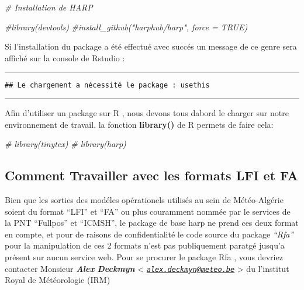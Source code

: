 \documentclass[
]{article}
\newenvironment{Shaded}{\begin{snugshade}}{\end{snugshade}}
\newcommand{\CommentTok}[1]{\textcolor[rgb]{0.56,0.35,0.01}{\textit{#1}}}
\begin{document}
\begin{Shaded}
\begin{Highlighting}[]
\CommentTok{\# Installation de HARP }

\CommentTok{\#library(devtools)}
\CommentTok{\#install\_github("harphub/harp", force = TRUE)}
\end{Highlighting}
\end{Shaded}

Si l'installation du package a été effectué avec succés un message de ce
genre sera affiché sur la console de Rstudio :

\begin{center}\rule{0.5\linewidth}{0.5pt}\end{center}

\begin{verbatim}
## Le chargement a nécessité le package : usethis
\end{verbatim}

\begin{center}\rule{0.5\linewidth}{0.5pt}\end{center}

Afin d'utiliser un package sur R , nous devons tous dabord le charger
sur notre environnement de travail. la fonction \textbf{library()} de R
permets de faire cela:

\begin{Shaded}
\begin{Highlighting}[]
\CommentTok{\# library(tinytex)}
\CommentTok{\# library(harp)}
\end{Highlighting}
\end{Shaded}

\hypertarget{comment-travailler-avec-les-formats-lfi-et-fa}{%
\subsection{Comment Travailler avec les formats LFI et
FA}\label{comment-travailler-avec-les-formats-lfi-et-fa}}

Bien que les sorties des modéles opérationels utilisés au sein de
Météo-Algérie soient du format ``LFI'' et ``FA'' ou plus couramment
nommée par le services de la PNT ``Fullpos'' et ``ICMSH'', le package de
base harp ne prend ces deux format en compte, et pour de raisons de
confidentialité le code source du package \emph{``Rfa''} pour la
manipulation de ces 2 formats n'est pas publiquement paratgé jusqu'a
présent sur aucun service web. Pour se procurer le package Rfa , vous
devriez contacter Monsieur \textbf{\emph{Alex} \emph{Deckmyn}}
\textless{}
\emph{\href{mailto:alex.deckmyn@meteo.be}{\nolinkurl{alex.deckmyn@meteo.be}}}
\textgreater{} du l'institut Royal de Météorologie (IRM)
\end{document}
